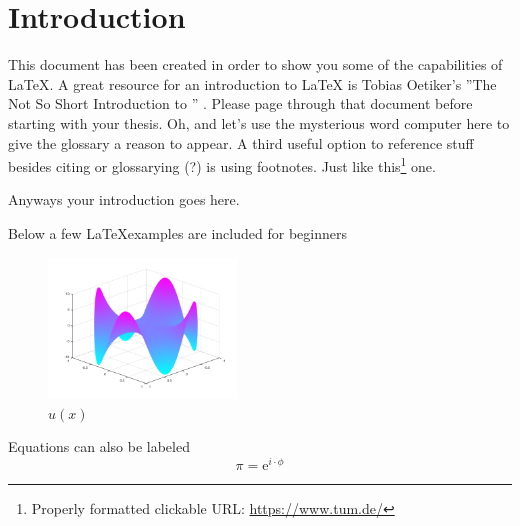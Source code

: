 \chapter{Introduction}
\label{chapter:Introduction}
	This document has been created in order to show you some of the capabilities 
of \LaTeX.  A great resource for an introduction to \LaTeX\xspace is Tobias
Oetiker's ''The Not So Short Introduction to \LaTeXe'' \cite{latex}.  Please
page through that document
before starting with your thesis.
Oh, and let's use the mysterious word \gls{computer} here to give the glossary
a reason to appear.
A third useful option to reference stuff besides citing or glossarying (?) 
is using footnotes. Just like
this\footnote{Properly formatted clickable URL: \url{https://www.tum.de/}}
one.
\par
Anyways your introduction goes here.


Below a few \LaTeX examples are included for beginners
\begin{figure}[ht]
  \centering
  \includegraphics[width=5cm]{images/swing_function_plot.png}
  \caption{$u(x)$}%
  \label{fig:swingPlot}
\end{figure}


Equations can also be labeled
\begin{equation}
	\pi = \mathrm{e}^{i\cdot\phi}
	\label{eq:equation1}
\end{equation}


